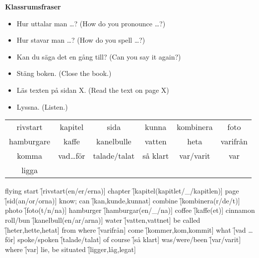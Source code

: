 
\begin{flushleft}
    \textbf{Klassrumsfraser}
    \begin{itemize}
        \item Hur uttalar man \ldots? (How do you pronounce \ldots?)
        \item Hur stavar man \ldots? (How do you spell \ldots?)
        \item Kan du säga det en gång till? (Can you say it again?)
        \item Stäng boken. (Close the book.)
        \item Läs texten på sidan X. (Read the text on page X)
        \item Lyssna. (Listen.)
    \end{itemize}
\end{flushleft}

\begin{center}
    \begin{tabular}{|c c c c c c|}
        \hline
        rivstart & kapitel & sida & kunna & kombinera & foto \\
        hamburgare & kaffe & kanelbulle & vatten & heta & varifrån \\
        komma & vad\ldots för & talade/talat & så klart & var/varit & var \\
        ligga &  &  &  &  &  \\
        \hline
    \end{tabular}
\end{center}

\begin{questions}
    \begin{multicols}{2}
        \raggedcolumns
        \question flying start \f[rivstart(en/er/erna)]
        \question chapter \f[kapitel(kapitlet/\_/kapitlen)]
        \question page \f[sid(an/or/orna)]
        \question know; can \f[kan,kunde,kunnat]
        \question combine \f[kombinera(r/de/t)]
        \question photo \f[foto(t/n/na)]
        \question hamburger \f[hamburgar(en/\_/na)]
        \question coffee \f[kaffe(et)]
        \question cinnamon roll/bun \f[kanelbull(en/ar/arna)]
        \question water \f[vatten,vattnet]
        \question be called \f[heter,hette,hetat]
        \question from where \f[varifrån]
        \question come \f[kommer,kom,kommit]
        \question what \f[vad \ldots för]
        \question spoke/spoken \f[talade/talat]
        \question of course \f[så klart]
        \question was/were/been \f[var/varit]
        \question where \f[var]
        \question lie, be situated \f[ligger,låg,legat]
    \end{multicols}
\end{questions}
